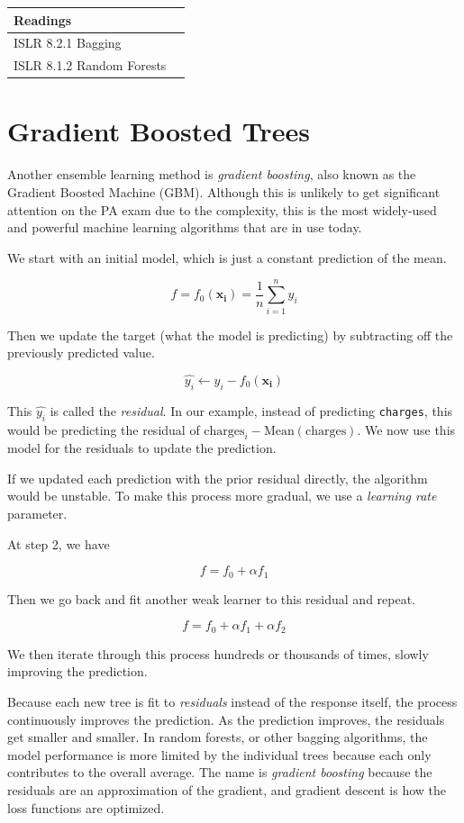 \documentclass[openany]{book}
\begin{document}
\begin{longtable}[]{@{}ll@{}}
\toprule
Readings &\tabularnewline
\midrule
\endhead
ISLR 8.2.1 Bagging &\tabularnewline
ISLR 8.1.2 Random Forests &\tabularnewline
\bottomrule
\end{longtable}

\hypertarget{gradient-boosted-trees}{%
\section{Gradient Boosted Trees}\label{gradient-boosted-trees}}

Another ensemble learning method is \emph{gradient boosting}, also known as the Gradient Boosted Machine (GBM). Although this is unlikely to get significant attention on the PA exam due to the complexity, this is the most widely-used and powerful machine learning algorithms that are in use today.

We start with an initial model, which is just a constant prediction of the mean.

\[f = f_0(\mathbf{x_i}) = \frac{1}{n}\sum_{i=1}^ny_i\]

Then we update the target (what the model is predicting) by subtracting off the previously predicted value.

\[ \hat{y_i} \leftarrow y_i - f_0(\mathbf{x_i})\]

This \(\hat{y_i}\) is called the \emph{residual}. In our example, instead of predicting \texttt{charges}, this would be predicting the residual of \(\text{charges}_i - \text{Mean}(\text{charges})\). We now use this model for the residuals to update the prediction.

If we updated each prediction with the prior residual directly, the algorithm would be unstable. To make this process more gradual, we use a \emph{learning rate} parameter.

At step 2, we have

\[f = f_0 + \alpha f_1\]

Then we go back and fit another weak learner to this residual and repeat.

\[f = f_0 + \alpha f_1 + \alpha f_2\]

We then iterate through this process hundreds or thousands of times, slowly improving the prediction.

Because each new tree is fit to \emph{residuals} instead of the response itself, the process continuously improves the prediction. As the prediction improves, the residuals get smaller and smaller. In random forests, or other bagging algorithms, the model performance is more limited by the individual trees because each only contributes to the overall average. The name is \emph{gradient boosting} because the residuals are an approximation of the gradient, and gradient descent is how the loss functions are optimized.
\end{document}
